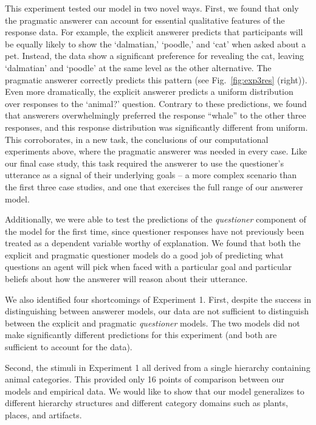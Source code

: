 \documentclass[12pt, floatsintext, jou]{apa6}
\begin{document}
This experiment tested our model in two novel ways. First, we found that only the pragmatic answerer can account for essential qualitative features of the response data. For example, the explicit answerer predicts that participants will be equally likely to show the `dalmatian,' `poodle,' and `cat' when asked about a pet. Instead, the data show a significant preference for revealing the cat, leaving `dalmatian' and `poodle' at the same level as the other alternative. The pragmatic answerer correctly predicts this pattern  (see Fig.~\ref{fig:exp3res} (right)). Even more dramatically, the explicit answerer predicts a uniform distribution over responses to the `animal?' question. Contrary to these predictions, we found that answerers overwhelmingly preferred the response ``whale'' to the other three responses, and this response distribution was significantly different from uniform. This corroborates, in a new task, the conclusions of our computational experiments above, where the pragmatic answerer was needed in every case. Like our final case study, this task required the answerer to use the questioner's utterance as a signal of their underlying goals -- a more complex scenario than the first three case studies, and one that exercises the full range of our answerer model. 

Additionally, we were able to test the predictions of the \emph{questioner} component of the model for the first time, since questioner responses have not previously been treated as a dependent variable worthy of explanation. We found that both the explicit and pragmatic questioner models do a good job of predicting what questions an agent will pick when faced with a particular goal and particular beliefs about how the answerer will reason about their utterance.

We also identified four shortcomings of Experiment 1. First, despite the success in distinguishing between answerer models, our data are not sufficient to distinguish between the explicit and pragmatic \emph{questioner} models. The two models did not make significantly different predictions for this experiment (and both are sufficient to account for the data). 

Second, the stimuli in Experiment 1 all derived from a single hierarchy containing animal categories. This provided only 16 points of comparison between our models and empirical data. We would like to show that our model generalizes to different hierarchy structures and different category domains such as plants, places, and artifacts. 
\end{document}
